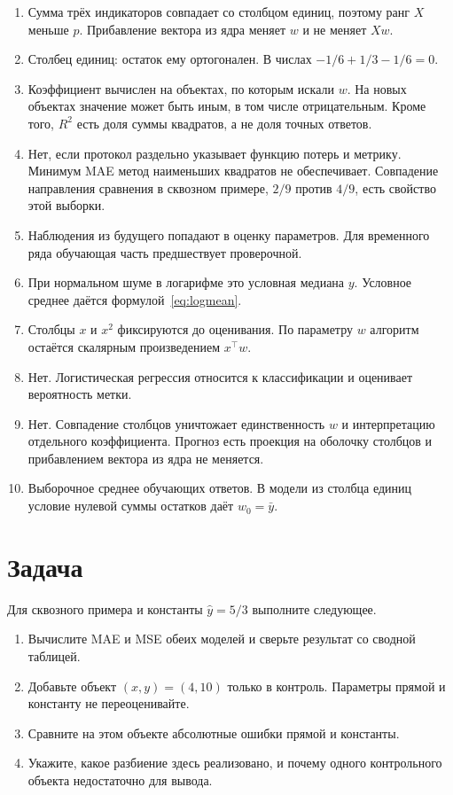 \documentclass[11pt,a4paper]{article}
\begin{document}
\begin{enumerate}
\item Сумма трёх индикаторов совпадает со столбцом единиц, поэтому ранг \(X\) меньше \(p\). Прибавление вектора из ядра меняет \(w\) и не меняет \(Xw\).
\item Столбец единиц: остаток ему ортогонален. В числах \(-1/6+1/3-1/6=0\).
\item Коэффициент вычислен на объектах, по которым искали \(w\). На новых объектах значение может быть иным, в том числе отрицательным. Кроме того, \(R^{2}\) есть доля суммы квадратов, а не доля точных ответов.
\item Нет, если протокол раздельно указывает функцию потерь и метрику. Минимум MAE метод наименьших квадратов не обеспечивает. Совпадение направления сравнения в сквозном примере, \(2/9\) против \(4/9\), есть свойство этой выборки.
\item Наблюдения из будущего попадают в оценку параметров. Для временного ряда обучающая часть предшествует проверочной.
\item При нормальном шуме в логарифме это условная медиана \(y\). Условное среднее даётся формулой~\eqref{eq:logmean}.
\item Столбцы \(x\) и \(x^{2}\) фиксируются до оценивания. По параметру \(w\) алгоритм остаётся скалярным произведением \(x^{\top}w\).
\item Нет. Логистическая регрессия относится к классификации и оценивает вероятность метки.
\item Нет. Совпадение столбцов уничтожает единственность \(w\) и интерпретацию отдельного коэффициента. Прогноз есть проекция на оболочку столбцов и прибавлением вектора из ядра не меняется.
\item Выборочное среднее обучающих ответов. В модели из столбца единиц условие нулевой суммы остатков даёт \(w_0=\bar y\).
\end{enumerate}

\section{Задача}

Для сквозного примера и константы \(\hat y=5/3\) выполните следующее.

\begin{enumerate}
\item Вычислите MAE и MSE обеих моделей и сверьте результат со сводной таблицей.
\item Добавьте объект \((x,y)=(4,10)\) только в контроль. Параметры прямой и константу не переоценивайте.
\item Сравните на этом объекте абсолютные ошибки прямой и константы.
\item Укажите, какое разбиение здесь реализовано, и почему одного контрольного объекта недостаточно для вывода.
\end{enumerate}
\end{document}

